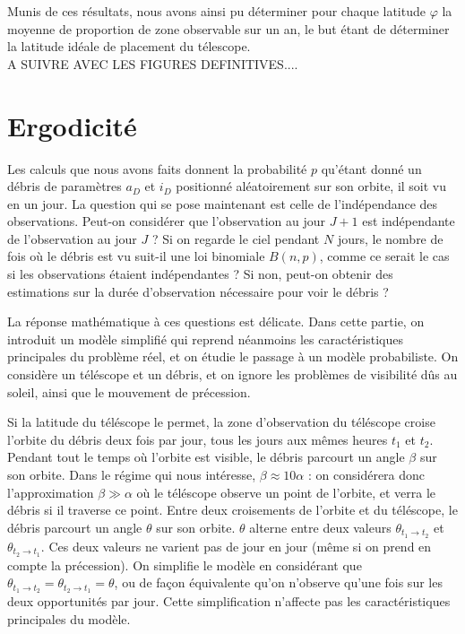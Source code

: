 \documentclass[a4paper,11pt]{article}
\numberwithin{section}{part}
\begin{document}
Munis de ces r\'esultats,  nous avons ainsi pu d\'eterminer pour chaque latitude $\varphi$ la moyenne de proportion de zone observable sur un an, le but \'etant de d\'eterminer la latitude id\'eale de placement du t\'elescope. \\

A SUIVRE AVEC LES FIGURES DEFINITIVES....


\section{Ergodicité}
Les calculs que nous avons faits donnent la probabilité $p$ qu'étant
donné un débris de paramètres $a_{D}$ et $i_{D}$ positionné
aléatoirement sur son orbite, il soit vu en un jour. La question qui
se pose maintenant est celle de l'indépendance des
observations. Peut-on considérer que l'observation au jour $J+1$ est
indépendante de l'observation au jour $J$ ? Si on regarde le ciel
pendant $N$ jours, le nombre de fois où le débris est vu suit-il une
loi binomiale $B(n,p)$, comme ce serait le cas si les observations
étaient indépendantes ? Si non, peut-on obtenir des estimations sur la
durée d'observation nécessaire pour voir le débris ?

La réponse mathématique à ces questions est délicate. Dans cette
partie, on introduit un modèle simplifié qui reprend néanmoins les
caractéristiques principales du problème réel, et on étudie le passage
à un modèle probabiliste. On considère un téléscope et un débris, et
on ignore les problèmes de visibilité dûs au soleil, ainsi que le
mouvement de précession.

Si la latitude du téléscope le permet, la zone d'observation du
téléscope croise l'orbite du débris deux fois par jour, tous les jours
aux mêmes heures $t_{1}$ et $t_{2}$. Pendant tout le temps où l'orbite
est visible, le débris parcourt un angle $\beta$ sur son orbite. Dans
le régime qui nous intéresse, $\beta \approx 10 \alpha$ : on
considérera donc l'approximation $\beta \gg \alpha$ où le téléscope
observe un point de l'orbite, et verra le débris si il traverse ce
point. Entre deux croisements de l'orbite et du téléscope, le débris
parcourt un angle $\theta$ sur son orbite. $\theta$ alterne entre deux
valeurs $\theta_{t_{1} \to t_{2}}$ et $\theta_{t_{2} \to t_{1}}$. Ces
deux valeurs ne varient pas de jour en jour (même si on prend en
compte la précession). On simplifie le modèle en considérant que
$\theta_{t_{1} \to t_{2}} = \theta_{t_{2} \to t_{1}} = \theta$, ou de
façon équivalente qu'on n'observe qu'une fois sur les deux
opportunités par jour. Cette simplification n'affecte pas les
caractéristiques principales du modèle.
\end{document}
